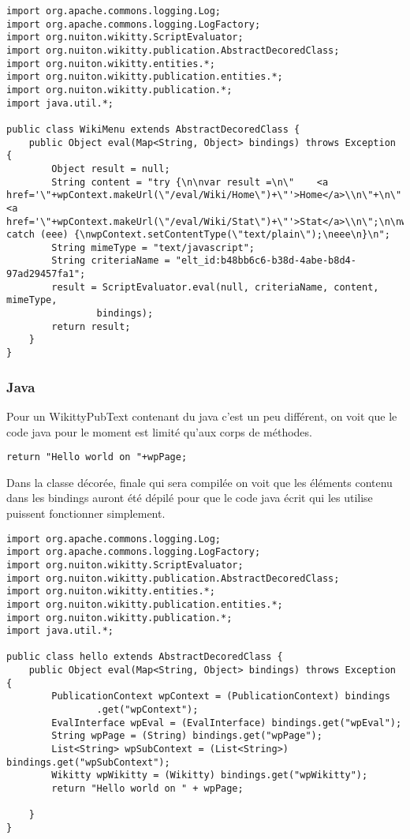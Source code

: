 \begin{lstlisting}
import org.apache.commons.logging.Log;
import org.apache.commons.logging.LogFactory;
import org.nuiton.wikitty.ScriptEvaluator;
import org.nuiton.wikitty.publication.AbstractDecoredClass;
import org.nuiton.wikitty.entities.*;
import org.nuiton.wikitty.publication.entities.*;
import org.nuiton.wikitty.publication.*;
import java.util.*;

public class WikiMenu extends AbstractDecoredClass {
    public Object eval(Map<String, Object> bindings) throws Exception {
        Object result = null;
        String content = "try {\n\nvar result =\n\"    <a href='\"+wpContext.makeUrl(\"/eval/Wiki/Home\")+\"'>Home</a>\\n\"+\n\"    <a href='\"+wpContext.makeUrl(\"/eval/Wiki/Stat\")+\"'>Stat</a>\\n\";\n\nwpContext.setContentType(\"text/html\");\nresult;\n} catch (eee) {\nwpContext.setContentType(\"text/plain\");\neee\n}\n";
        String mimeType = "text/javascript";
        String criteriaName = "elt_id:b48bb6c6-b38d-4abe-b8d4-97ad29457fa1";
        result = ScriptEvaluator.eval(null, criteriaName, content, mimeType,
                bindings);
        return result;
    }
}
\end{lstlisting}


\subsubsection*{Java}

Pour un WikittyPubText contenant du java c'est un peu différent, on voit
que le code java pour le moment est limité qu'aux corps de méthodes.

\begin{lstlisting}
return "Hello world on "+wpPage;
\end{lstlisting}

Dans la classe décorée, finale qui sera compilée on voit que les éléments 
contenu dans les bindings auront été dépilé pour que le code java écrit qui les 
utilise puissent fonctionner simplement.

\begin{lstlisting}
import org.apache.commons.logging.Log;
import org.apache.commons.logging.LogFactory;
import org.nuiton.wikitty.ScriptEvaluator;
import org.nuiton.wikitty.publication.AbstractDecoredClass;
import org.nuiton.wikitty.entities.*;
import org.nuiton.wikitty.publication.entities.*;
import org.nuiton.wikitty.publication.*;
import java.util.*;

public class hello extends AbstractDecoredClass {
    public Object eval(Map<String, Object> bindings) throws Exception {
        PublicationContext wpContext = (PublicationContext) bindings
                .get("wpContext");
        EvalInterface wpEval = (EvalInterface) bindings.get("wpEval");
        String wpPage = (String) bindings.get("wpPage");
        List<String> wpSubContext = (List<String>) bindings.get("wpSubContext");
        Wikitty wpWikitty = (Wikitty) bindings.get("wpWikitty");
        return "Hello world on " + wpPage;

    }
}
\end{lstlisting}



